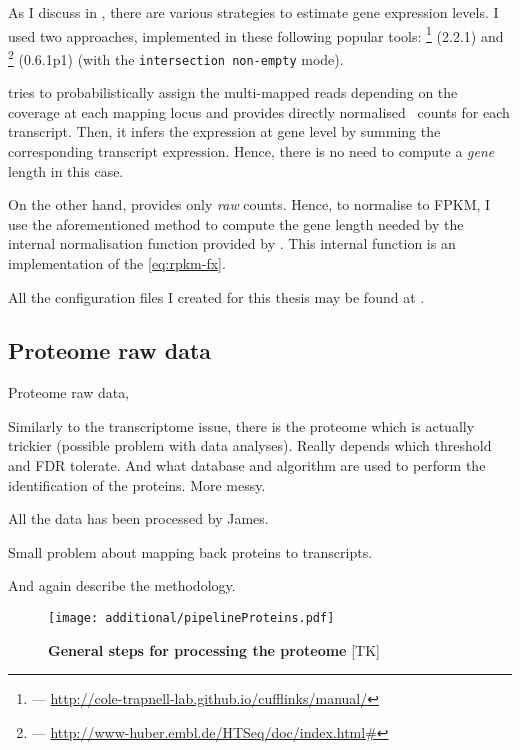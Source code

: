 As I discuss in , there are various strategies to estimate
gene expression levels. I used two approaches, implemented in these
following popular tools:
\footnote{ ---
\href{http://cole-trapnell-lab.github.io/cufflinks/manual/}%
{http://cole-trapnell-lab.github.io/cufflinks/manual/}} (2.2.1) 
and \footnote{ ---
\href{http://www-huber.embl.de/HTSeq/doc/index.html\#}%
{http://www-huber.embl.de/HTSeq/doc/index.html\#}} (0.6.1p1) 
(with the \texttt{intersection non-empty} mode).

 tries to probabilistically assign the multi-mapped reads
depending on the coverage at each mapping locus and provides directly normalised
\FPKM\ counts for each transcript. Then, it infers the expression at gene level
by summing the corresponding transcript expression. Hence, there is no need to
compute a \emph{gene} length in this case.

On the other hand,  provides only \emph{raw} counts. Hence, to
normalise to \gls{FPKM}, I use the aforementioned method to compute the gene
length needed by the internal normalisation function provided by \irap. This
internal function is an implementation of the \cref{eq:rpkm-fx}.

All the configuration files I created for this thesis may be found at
\addressToirapConfFiles.

\subsection{Proteome raw data}

Proteome raw data,

Similarly to the transcriptome issue, there is the proteome which is actually
trickier (possible problem with  data analyses). Really depends which
threshold and \gls{FDR} tolerate. And what database and algorithm are used to perform
the identification of the proteins. More messy.

All the data has been processed by James.

Small problem about mapping back proteins to transcripts.



And again describe the methodology.

  \begin{figure}
      \texttt{[image: additional/pipelineProteins.pdf]}\centering
      \caption[General steps for processing the proteome
      data]{\label{fig:pipelineProt}\textbf{General steps for processing the
      proteome} [TK] }
  \end{figure}

